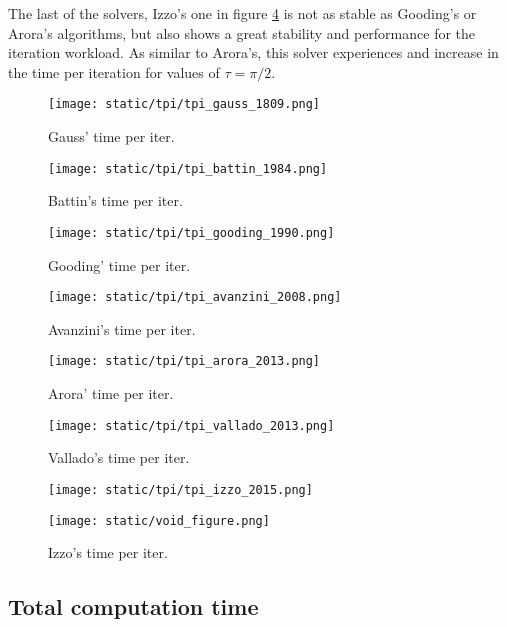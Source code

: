 The last of the solvers, Izzo's one in figure \ref{fig:tpi_izzo} is not as
stable as Gooding's or Arora's algorithms, but also shows a great stability and
performance for the iteration workload. As similar to Arora's, this solver
experiences and increase in the time per iteration for values of $\tau=\pi/2$.


\begin{figure}[H]
  \begin{minipage}{0.48\textwidth}
    \centering
    \texttt{[image: static/tpi/tpi\_gauss\_1809.png]}
    \caption{Gauss' time per iter.}\label{fig:tpi_gauss}
  \end{minipage}\hfill
  \begin{minipage}{0.48\textwidth}
    \centering
    \texttt{[image: static/tpi/tpi\_battin\_1984.png]}
    \caption{Battin's time per iter.}\label{fig:tpi_battin}
  \end{minipage}
\end{figure}

\begin{figure}[H]
  \begin{minipage}{0.48\textwidth}
    \centering
    \texttt{[image: static/tpi/tpi\_gooding\_1990.png]}
    \caption{Gooding' time per iter.}\label{fig:tpi_gooding}
  \end{minipage}\hfill
  \begin{minipage}{0.48\textwidth}
    \centering
    \texttt{[image: static/tpi/tpi\_avanzini\_2008.png]}
    \caption{Avanzini's time per iter.}\label{fig:tpi_avanzini}
  \end{minipage}
\end{figure}

\begin{figure}[H]
  \begin{minipage}{0.48\textwidth}
    \centering
    \texttt{[image: static/tpi/tpi\_arora\_2013.png]}
    \caption{Arora' time per iter.}\label{fig:tpi_arora}
  \end{minipage}\hfill
  \begin{minipage}{0.48\textwidth}
    \centering
    \texttt{[image: static/tpi/tpi\_vallado\_2013.png]}
    \caption{Vallado's time per iter.}\label{fig:tpi_vallado}
  \end{minipage}
\end{figure}

\begin{figure}[H]
  \begin{minipage}{0.48\textwidth}
    \centering
    \texttt{[image: static/tpi/tpi\_izzo\_2015.png]}
    \caption{Izzo's time per iter.}\label{fig:tpi_izzo}
  \end{minipage}\hfill
  \begin{minipage}{0.48\textwidth}
    \centering
    \texttt{[image: static/void\_figure.png]}
  \end{minipage}
\end{figure}






\subsection{Total computation time}
